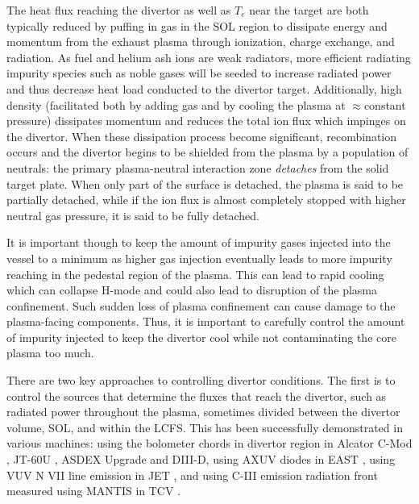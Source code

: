 The heat flux reaching the divertor as well as $T_e$ near the target are both typically reduced by puffing in gas in the \ac{SOL} region to dissipate energy and momentum from the exhaust plasma through ionization, charge exchange, and radiation.
As fuel and helium ash ions are weak radiators, more efficient radiating impurity species such as noble gases will be seeded to increase radiated power and thus decrease heat load conducted to the divertor target.
Additionally, high density (facilitated both by adding gas and by cooling the plasma at $\approx$constant pressure) dissipates momentum and reduces the total ion flux which impinges on the divertor.
When these dissipation process become significant, recombination occurs and the divertor begins to be shielded from the plasma by a population of neutrals: the primary plasma-neutral interaction zone \emph{detaches} from the solid target plate.
When only part of the surface is detached, the plasma is said to be partially detached, while if the ion flux is almost completely stopped with higher neutral gas pressure, it is said to be fully detached.

It is important though to keep the amount of impurity gases injected into the vessel to a minimum as higher gas injection eventually leads to more impurity reaching in the pedestal region of the plasma.
This can lead to rapid cooling which can collapse H-mode and could also lead to disruption of the plasma confinement.
Such sudden loss of plasma confinement can cause damage to the plasma-facing components.
Thus, it is important to carefully control the amount of impurity injected to keep the divertor cool while not contaminating the core plasma too much.

There are two key approaches to controlling divertor conditions.
The first is to control the sources that determine the fluxes that reach the divertor, such as radiated power throughout the plasma, sometimes divided between the divertor volume, \ac{SOL}, and within the \ac{LCFS}.
This has been successfully demonstrated in various machines:
using the bolometer chords in divertor region in Alcator C-Mod \cite{Goetz_1999_POP}, JT-60U \cite{Asakura_2009_NF}, ASDEX Upgrade \cite{Kallenbach_2012_NF} and DIII-D\cite{Eldon_2019_NME},
using AXUV diodes in EAST \cite{Wu_2018_NF},
using VUV N VII line emission in JET \cite{Maddison_2011_NF}, and
using C-III emission radiation front measured using MANTIS in TCV \cite{Ravensbergen_2021_NC}.

